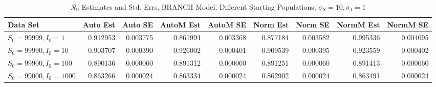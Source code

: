 \documentclass[12pt]{article}
\newcommand{\rr}{\ensuremath{\mathcal{R}_0}}
\begin{document}
\begin{table}[H]
	
	\caption{$\rr$ Estimates and Std. Errs, BRANCH Model,
		Different Starting Populations, 
		$\sigma_S = 10, \sigma_I = 1$}
	\begin{footnotesize}
		\hskip -1.7cm
	\begin{tabular}{l|r|r|r|r|r|r|r|r}
		\hline
		Data Set & Auto Est & Auto SE & AutoM Est & AutoM SE & Norm Est & Norm SE & NormM Est & NormM SE\\
		\hline
		$S_0 = 99999, I_0 = 1$ & 0.912953 & 0.003775 & 0.861994 & 0.003368 & 0.877184 & 0.003582 & 0.995336 & 0.004095\\
		\hline
		$S_0 = 99990, I_0 = 10$ & 0.903707 & 0.000390 & 0.926002 & 0.000401 & 0.909539 & 0.000395 & 0.923559 & 0.000402\\
		\hline
		$S_0 = 99900, I_0 = 100$ & 0.890136 & 0.000060 & 0.891312 & 0.000060 & 0.891251 & 0.000060 & 0.891413 & 0.000060\\
		\hline
		$S_0 = 99000, I_0 = 1000$ & 0.863266 & 0.000024 & 0.863334 & 0.000024 & 0.862902 & 0.000024 & 0.863491 & 0.000024\\
		\hline
	\end{tabular}
\end{footnotesize}
\end{table}
\end{document}
